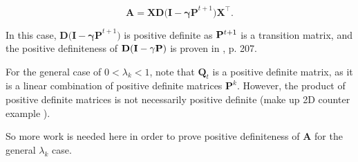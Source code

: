 \documentclass[11pt,A4paper]{article}
\begin{document}
\[ \mathbf{A} = \mathbf{X D (I - \gamma P}^{t+1}) \mathbf{X}^\intercal. \]

In this case, $\mathbf{D (I - \gamma P}^{t+1})$ is positive definite as ${\bf P}^{t+1}$ is a transition matrix, and the positive definiteness of $\bf D (I - \gamma P)$ is proven in \cite{sutton-barto-2018}, p. 207.

For the general case of $0 < \lambda_k < 1$, note that $\mathbf{Q}_t$ is a positive definite matrix, as it is a linear combination of positive definite matrices $\mathbf{P}^k$. However, the product of positive definite matrices is not necessarily positive definite (make up 2D counter example%
).

\medskip

So more work is needed here in order to prove positive definiteness of $\mathbf{A}$ for the general $\lambda_k$ case.


\newpage



\end{document}
